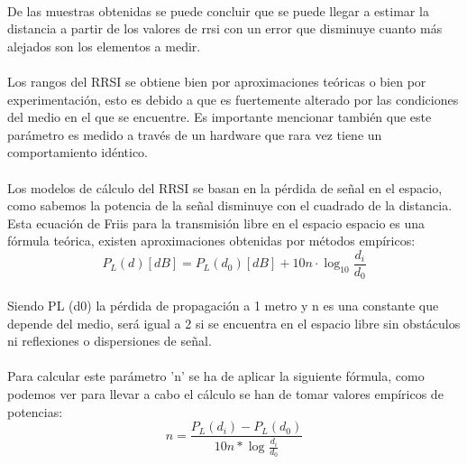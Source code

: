 \documentclass[a4paper ,12pt, onecolumn]{article}
\begin{document}
            \paragraph{}
            De las muestras obtenidas se puede concluir que se puede llegar a estimar la distancia a partir de los valores
            de rrsi con un error que disminuye cuanto más alejados son los elementos a medir. 
            \paragraph{}
            Los rangos del RRSI se obtiene bien por aproximaciones teóricas o bien por experimentación, esto es debido a que 
            es fuertemente alterado por las condiciones del medio en el que se encuentre. Es importante mencionar también que
            este parámetro es medido a través de un hardware que rara vez tiene un comportamiento idéntico.
            \paragraph{}
            Los modelos de cálculo del RRSI se basan en la pérdida de señal en el espacio, como sabemos la potencia de la señal
            disminuye con el cuadrado de la distancia. Esta ecuación de Friis para la transmisión libre en el espacio espacio es 
            una fórmula teórica, existen aproximaciones obtenidas por métodos empíricos:
            \begin{equation}
                P_L(d) [dB] = P_L(d_0) [dB] + 10n ·\log_{10} \frac{ d_i }{d_0 } 
            \end{equation}
            \paragraph{}
            Siendo PL (d0)  la pérdida de propagación a 1 metro y n es una constante que depende del medio, será igual
            a 2 si se encuentra en el espacio libre sin obstáculos ni reflexiones o dispersiones de señal.
            \paragraph{}
            Para calcular este parámetro 'n' se ha de aplicar la siguiente fórmula, como podemos ver para llevar a cabo el 
            cálculo se han de tomar valores empíricos de potencias:
            \begin{equation}
                n = \frac{ P_L(d_i) - P_L(d_0) }{10n*\log_{}\frac{d_i}{d_0}}
            \end{equation}
\end{document}
